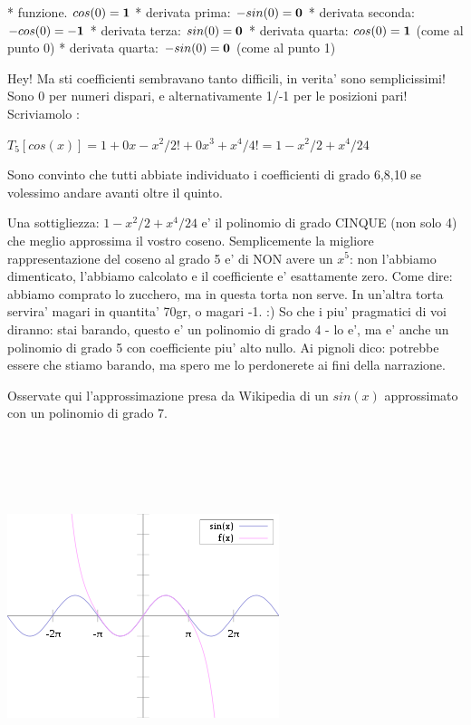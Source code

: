 * funzione. $ cos(0) = \bf{1}$
* derivata prima: $ -sin(0) = \bf{0}$
* derivata seconda: $ -cos(0) = \bf{-1}$
* derivata terza: $ sin(0) = \bf{0}$
* derivata quarta:  $ cos(0) = \bf{1}$ (come al punto 0)
* derivata quarta: $ -sin(0) = \bf{0}$ (come al punto 1)

Hey! Ma sti coefficienti sembravano tanto difficili, in verita' sono semplicissimi! Sono 0 per numeri dispari, e alternativamente 1/-1 per le posizioni pari!
Scriviamolo \acazzodicane : 

$ T_5[cos(x)] = 1 +0x - x^2/2! + 0x^3 + x^4/4! = 1 - x^2/2 + x^4/24 $

Sono convinto che tutti abbiate individuato i coefficienti di grado 6,8,10 se volessimo andare avanti oltre il quinto.

Una sottigliezza: $1 - x^2/2 + x^4/24 $ e' il polinomio di grado CINQUE (non solo 4) che meglio approssima il vostro coseno. Semplicemente 
la migliore rappresentazione del coseno al grado 5 e' di NON avere un $x^5$: non l'abbiamo dimenticato, l'abbiamo calcolato e il coefficiente 
e' esattamente zero. Come dire: abbiamo comprato lo zucchero, ma in questa torta non serve. In un'altra torta servira' magari in quantita' 70gr,
o magari -1. :) So che i piu' pragmatici di voi diranno: stai barando, questo e' un polinomio di grado 4 - lo e', ma e' anche un polinomio di
grado 5 con coefficiente piu' alto nullo. Ai pignoli dico: potrebbe essere che stiamo barando, ma spero me lo perdonerete ai fini della narrazione. 

Osservate qui l'approssimazione presa da Wikipedia di un $sin(x)$ approssimato con un polinomio di grado 7.

\includegraphics[height = 300pt, width = 225pt]{images/07taylor/taylor-seno-approx-7mo-grado.png}

